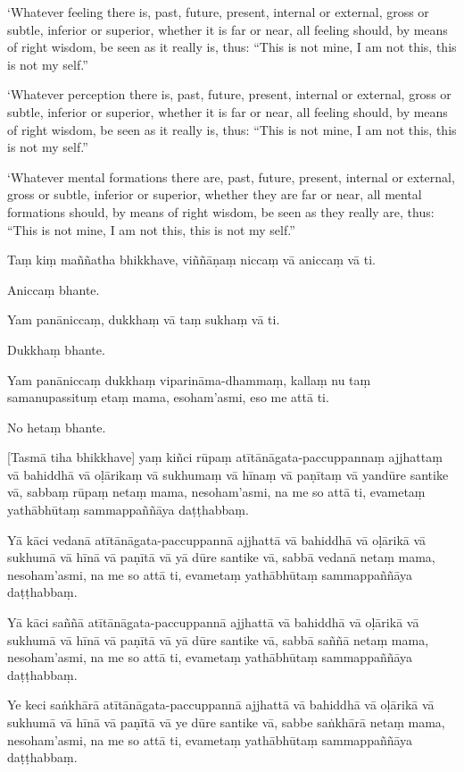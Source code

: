 ‘Whatever feeling there is, past, future, present, internal or
external, gross or subtle, inferior or superior, whether it is far or
near, all feeling should, by means of right wisdom, be seen as it really
is, thus: “This is not mine, I am not this, this is not my self.”

‘Whatever perception there is, past, future, present, internal or
external, gross or subtle, inferior or superior, whether it is far or
near, all feeling should, by means of right wisdom, be seen as it really
is, thus: “This is not mine, I am not this, this is not my self.”

‘Whatever mental formations there are, past, future, present, internal
or external, gross or subtle, inferior or superior, whether they are far
or near, all mental formations should, by means of right wisdom, be seen
as they really are, thus: “This is not mine, I am not this, this is not
my self.”

\clearpage

\paliText
\markboth{\paliTitle}{\rightmark}

Taṃ kiṃ maññatha bhikkhave, viññāṇaṃ niccaṃ vā aniccaṃ vā ti.

Aniccaṃ bhante.

Yam panāniccaṃ, dukkhaṃ vā taṃ sukhaṃ vā ti.

Dukkhaṃ bhante.

Yam panāniccaṃ dukkhaṃ viparināma-dhammaṃ, kallaṃ nu taṃ samanupassituṃ
etaṃ mama, esoham'asmi, eso me attā ti.

No hetaṃ bhante.

[Tasmā tiha bhikkhave] yaṃ kiñci rūpaṃ atītānāgata-paccuppannaṃ ajjhattaṃ
vā bahiddhā vā oḷārikaṃ vā sukhumaṃ vā hīnaṃ vā paṇītaṃ vā yandūre
santike vā, sabbaṃ rūpaṃ netaṃ mama, nesoham'asmi, na me so attā ti,
evametaṃ yathābhūtaṃ sammappaññāya daṭṭhabbaṃ.

Yā kāci vedanā atītānāgata-paccuppannā ajjhattā vā bahiddhā vā oḷārikā
vā sukhumā vā hīnā vā paṇītā vā yā dūre santike vā, sabbā vedanā netaṃ
mama, nesoham'asmi, na me so attā ti, evametaṃ yathābhūtaṃ sammappaññāya
daṭṭhabbaṃ.

Yā kāci saññā atītānāgata-paccuppannā ajjhattā vā bahiddhā vā oḷārikā vā
sukhumā vā hīnā vā paṇītā vā yā dūre santike vā, sabbā saññā netaṃ mama,
nesoham'asmi, na me so attā ti, evametaṃ yathābhūtaṃ sammappaññāya
daṭṭhabbaṃ.

Ye keci saṅkhārā atītānāgata-paccuppannā ajjhattā vā bahiddhā vā oḷārikā
vā sukhumā vā hīnā vā paṇītā vā ye dūre santike vā, sabbe saṅkhārā netaṃ
mama, nesoham'asmi, na me so attā ti, evametaṃ yathābhūtaṃ sammappaññāya
daṭṭhabbaṃ.

